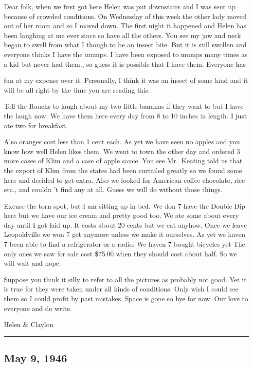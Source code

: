 \documentclass[
]{book}
\begin{document}
Dear folk, when we first got here Helen was put downstairs and I was sent up because of crowded conditions. On Wednesday of this week the other lady moved out of her room and so I moved down. The first night it happened and Helen has been laughing at me ever since so have all the others. You see my jaw and neck began to swell from what I though to be an insect bite. But it is still swollen and everyone thinks I have the mumps. I have been exposed to mumps many times as a kid but never had them., so guess it is possible that I have them. Everyone has

fun at my expense over it. Personally, I think it was an insect of some kind and it will be all right by the time you are reading this.

Tell the Rauchs to laugh about my two little bananas if they want to but I have the laugh now. We have them here every day from 8 to 10 inches in length. I just ate two for breakfast.

Also oranges cost less than 1 cent each. As yet we have seen no apples and you know how well Helen likes them. We went to town the other day and ordered 3 more cases of Klim and a case of apple sauce. You see Mr.~Keating told us that the export of Klim from the states had been curtailed greatly so we found some here and decided to get extra. Also we looked for American coffee chocolate, rice etc., and couldn 't find any at all. Guess we will do without those things.

Excuse the torn spot, but I am sitting up in bed. We don 7 have the Double Dip here but we have our ice cream and pretty good too. We ate some about every day until I got laid up. It costs about 20 cents but we eat anyhow. Once we leave Leopoldville we won 7 get anymore unless we make it ourselves. As yet we haven 7 been able to find a refrigerator or a radio. We haven 7 bought bicycles yet-The only ones we saw for sale cost \$75.00 when they should cost about half. So we will wait and hope.

Suppose you think it silly to refer to all the pictures as probably not good. Yet it is true for they were taken under all kinds of conditions. Only wish I could see them so I could profit by past mistakes. Space is gone so bye for now. Our love to everyone and do write.

Helen \& Claylon

\begin{center}\rule{0.5\linewidth}{0.5pt}\end{center}

\hypertarget{may-9-1946}{%
\subsection{May 9, 1946}\label{may-9-1946}}
\end{document}
